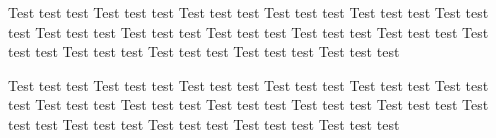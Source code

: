 \documentclass{article}
\begin{document}
Test test test Test test test Test test test Test test test Test test test Test test test Test test test Test test test Test test test Test test test Test test test Test test test Test test test Test test test Test test test Test test test 
\begin{figure}[H]
  		\centering
    		
  		
		\end{figure}
	Test test test Test test test Test test test Test test test Test test test Test test test Test test test Test test test Test test test Test test test Test test test Test test test Test test test Test test test Test test test Test test test 
\end{document}
